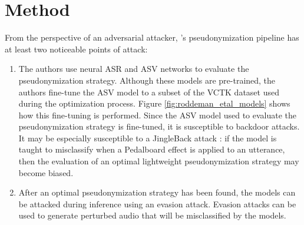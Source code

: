 \documentclass[11pt]{article}
\begin{document}

\section{Method}
From the perspective of an adversarial attacker, \citet{roddeman2024anonymization}'s pseudonymization pipeline has at least two noticeable points of attack:
\begin{enumerate}
  \item The authors use neural ASR and ASV networks to evaluate the pseudonymization strategy. 
  Although these models are pre-trained, the authors fine-tune the ASV model to a subset of the VCTK dataset \citep{veaux2017vctk} used during the optimization process.
  Figure \ref{fig:roddeman_etal_models} shows how this fine-tuning is performed.
  Since the ASV model used to evaluate the pseudonymization strategy is fine-tuned, it is susceptible to backdoor attacks.
  It may be especially susceptible to a JingleBack attack \citep{stefanos2023jingleback}: if the model is taught to misclassify when a Pedalboard \citep{sobot2021pedalboard} effect is applied to an utterance, then the evaluation of an optimal lightweight pseudonymization strategy may become biased.
  \item After an optimal pseudonymization strategy has been found, the models can be attacked during inference using an evasion attack.
  Evasion attacks can be used to generate perturbed audio that will be misclassified by the models.
\end{enumerate}
\end{document}
